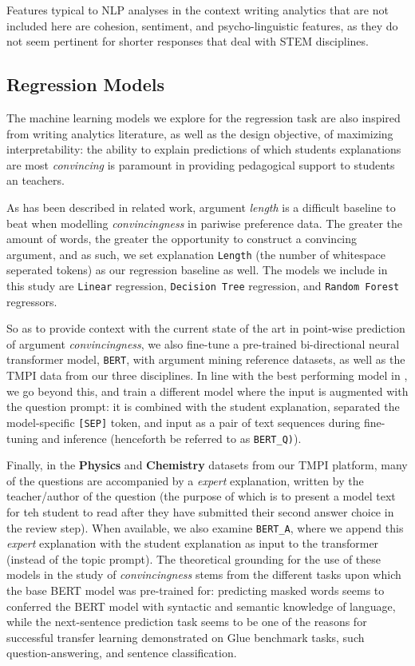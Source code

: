 \documentclass[notitlepage,12pt]{jedm}
\begin{document}
Features typical to NLP analyses in the context writing analytics that are not 
included here are cohesion, sentiment, and psycho-linguistic features, as they 
do not seem pertinent for shorter responses that deal with STEM disciplines.

\subsection{Regression Models}

The machine learning models we explore for the regression task are also 
inspired from writing analytics literature, as well as the design objective, of 
maximizing interpretability: the ability to explain predictions of which 
students explanations are most \textit{convincing} is paramount in providing 
pedagogical support to students an teachers.

As has been described in related work, argument \textit{length} is a difficult 
baseline to beat when modelling \textit{convincingness} in pariwise 
preference data.
The greater the amount of words, the greater the opportunity to construct a 
convincing argument, and as such, we set explanation \verb|Length| (the number 
of whitespace seperated tokens) as our regression baseline as well. 
The models we include in this study are \verb|Linear| regression, 
\verb|Decision Tree| regression, and \verb|Random Forest| regressors.

So as to provide context with the current state of the art in point-wise 
prediction of argument \textit{convincingness}, we also fine-tune a pre-trained 
bi-directional neural transformer model, \verb|BERT|, with argument mining 
reference datasets, as well as the TMPI data from our three disciplines. 
In line with the best performing model in \cite{gretz_large-scale_2019}, we go 
beyond this, and train a different model where the input is augmented with the 
question prompt: it is combined with the student explanation, separated the 
model-specific \verb|[SEP]| token, and input as a pair of text sequences during 
fine-tuning and inference (henceforth be referred to as \verb|BERT_Q)|).

Finally, in the \textbf{Physics} and \textbf{Chemistry} datasets from our TMPI 
platform, many of the questions are accompanied by a \textit{expert} 
explanation, written by the teacher/author of the question (the purpose of 
which is to present a model text for teh student to read after they have 
submitted their second answer choice in the review step).
When available, we also examine \verb|BERT_A|, where we append this 
\textit{expert} explanation with the student explanation as input to the 
transformer (instead of the topic prompt).
The theoretical grounding for the use of these models in the study of 
\textit{convincingness} stems from the different tasks upon which the base BERT 
model was pre-trained for: predicting masked words seems to conferred the BERT 
model with syntactic and semantic knowledge of language, while the 
next-sentence prediction task seems to be one of the reasons for successful 
transfer learning demonstrated on Glue benchmark tasks, such 
question-answering, and sentence classification. 
\end{document}
